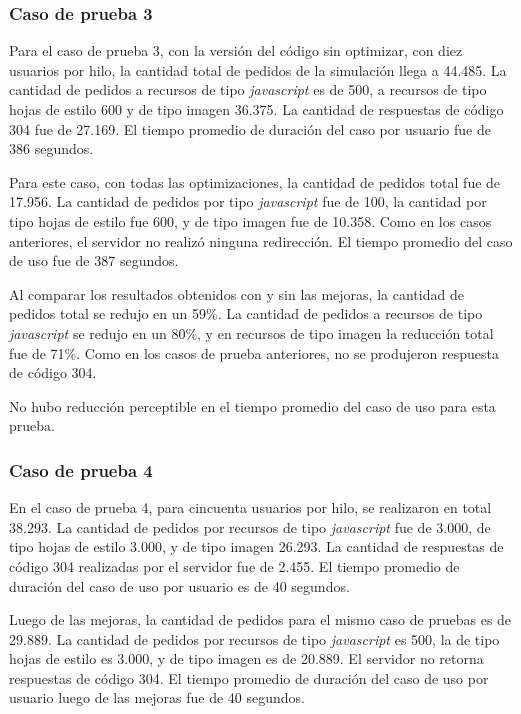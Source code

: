 \subsubsection{Caso de prueba 3}

Para el caso de prueba 3, con la versión del código sin optimizar, con diez usuarios por hilo, la cantidad total de pedidos de la simulación llega a 44.485. La cantidad de pedidos a
recursos de tipo \emph{javascript} es de 500, a recursos de tipo hojas de estilo 600 y de tipo imagen 36.375. La cantidad de respuestas de código 304 fue de 27.169. El tiempo 
promedio de duración del caso por usuario fue de 386 segundos.

Para este caso, con todas las optimizaciones, la cantidad de pedidos total fue de 17.956. La cantidad de pedidos por tipo \emph{javascript} fue de 100,
la cantidad por tipo hojas de estilo fue 600, y de tipo imagen fue de 10.358. Como en los casos anteriores, el servidor no realizó ninguna
redirección. El tiempo promedio del caso de uso fue de 387 segundos.

Al comparar los resultados obtenidos con y sin las mejoras, la cantidad de pedidos total se redujo en un 59\%. La cantidad de pedidos a recursos de tipo 
\emph{javascript} se redujo en un 80\%, y en recursos de tipo imagen la reducción total fue de 71\%. Como en los casos de prueba anteriores, no se 
produjeron respuesta de código 304.

No hubo reducción perceptible en el tiempo promedio del caso de uso para esta prueba.

\subsubsection{Caso de prueba 4}

En el caso de prueba 4, para cincuenta usuarios por hilo, se realizaron en total 38.293. La cantidad de pedidos por recursos de tipo
\emph{javascript} fue de 3.000, de tipo hojas de estilo 3.000, y de tipo imagen 26.293. La cantidad de respuestas de
código 304 realizadas por el servidor fue de 2.455. El tiempo promedio de duración del caso de uso por usuario es de 40 segundos.

Luego de las mejoras, la cantidad de pedidos para el mismo caso de pruebas es de 29.889. La cantidad de pedidos por recursos de tipo
\emph{javascript} es 500, la de tipo hojas de estilo es 3.000, y de tipo imagen es de 20.889. El servidor no
retorna respuestas de código 304. El tiempo promedio de duración del caso de uso por usuario luego de las mejoras fue de 40 segundos.

